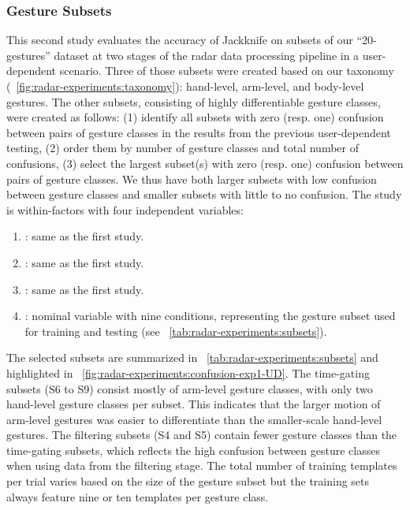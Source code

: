 \subsubsection{Gesture Subsets} \label{sec:radar-experiments:gesture-subsets:protocol:gesture-subsets}
This second study evaluates the accuracy of Jackknife on subsets of our ``20-gestures'' dataset at two stages of the radar data processing pipeline in a user-dependent scenario. Three of those subsets were created based on our taxonomy (\fig~\ref{fig:radar-experiments:taxonomy}): hand-level, arm-level, and body-level gestures. The other subsets, consisting of highly differentiable gesture classes, were created as follows: (1) identify all subsets with zero (resp. one) confusion between pairs of gesture classes in the results from the previous user-dependent testing, (2) order them by number of gesture classes and total number of confusions, (3) select the largest subset(s) with zero (resp. one) confusion between pairs of gesture classes. We thus have both larger subsets with low confusion between gesture classes and smaller subsets with little to no confusion.  The study is within-factors with four independent variables:
\begin{enumerate}
    \item {}: same as the first study.
    \item {}: same as the first study.
    \item {}: same as the first study.
    \item {}: nominal variable with nine conditions, representing the gesture subset used for training and testing (see \tab~\ref{tab:radar-experiments:subsets}).
\end{enumerate}
The selected subsets are summarized in \tab~\ref{tab:radar-experiments:subsets} and highlighted in \fig~\ref{fig:radar-experiments:confusion-exp1-UD}. 
The time-gating subsets (S6 to S9) consist mostly of arm-level gesture classes, with only two hand-level gesture classes per subset. This indicates that the larger motion of arm-level gestures was easier to differentiate than the smaller-scale hand-level gestures. The filtering subsets (S4 and S5) contain fewer gesture classes than the time-gating subsets, which reflects the high confusion between gesture classes when using data from the filtering stage.
The total number of training templates per trial varies based on the size of the gesture subset but the training sets always feature nine or ten templates per gesture class.

